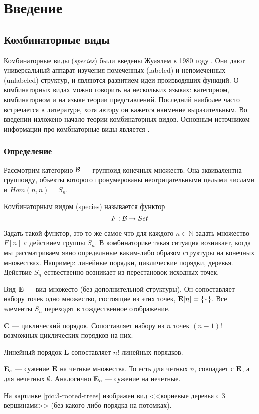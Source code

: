 \section{Введение}

\subsection{Комбинаторные виды}
Комбинаторные виды (\emph{species}) были введены Жуаялем в 1980 году \cite{J1}.
Они дают универсальный аппарат изучения помеченных (labeled) и
непомеченных (unlabeled) структур, и являются развитием идеи производящих
функций. О комбинаторных видах можно говорить на нескольких языках: категорном,
комбинаторном и на языке теории представлений. Последний наиболее часто
встречается в литературе, хотя автору он кажется наимение выразительным.
Во введении изложено начало теории комбинаторных видов. Основным источником
информации про комбнаторные виды является \cite{BergTrees}.
\subsubsection{Определение}
Рассмотрим категорию $\mathcal B$ --- группоид конечных множеств. Она эквивалентна
группоиду, объекты которого пронумерованы неотрицательными целыми числами и
$Hom(n, n) = S_n$.
\begin{definition}
Комбинаторным видом (species) называется функтор $$F:\mathcal B \rightarrow Set$$
\end{definition}

Задать такой функтор, это то же самое что для каждого $n \in
\mathbb N$ задать множество $F[n]$ с действием группы $S_n$. В комбинаторике
такая ситуация возникает, когда мы рассматриваем явно определнные каким-либо
образом структуры на конечных множествах. Например: линейные порядки,
циклические порядки, деревья. Действие $S_n$ ествественно возникает из
перестановок исходных точек.
\begin{example}
Вид $\mathbf E$ --- вид множесто (без дополнительной структуры). Он
сопоставляет набору точек одно множество, состоящие из этих точек, 
$\mathbf E[n] =\{*\}$. Все элементы $S_n$ переходят в тождественное отображение. 
\end{example}
\begin{example}
$\mathbf C$ --- циклический порядок. Сопоставляет набору из $n$ точек
$(n-1)!$ возможных циклических порядков на них. 
\end{example}
\begin{example}
Линейный порядок $\mathbf L$ сопоставляет $n!$ линейных
порядков. 
\end{example}
\begin{example}
$\mathbf E_e$ --- сужение $\mathbf E$ на четные множества. То есть для четных
$n$, совпадает с $\mathbf E$, а для нечетных $\emptyset$. 
Аналогично $\mathbf E_o$ --- сужение на нечетные.
\end{example}
\begin{example}
На картинке \ref{pic:3-rooted-trees} изображен вид <<корневые
деревья с 3 вершинами>> (без какого-либо порядка на потомках).
\end{example}

